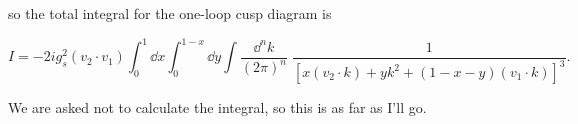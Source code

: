 so the total integral for the one-loop cusp diagram is

\begin{equation}
  I = -2ig_s^2 (v_2 \cdot v_1) \int_0^1 \dd x \int_0^{1-x} \dd y \int \frac{\dd^nk}{(2\pi)^n} \; \frac{1}{[x(v_2 \cdot k) + yk^2 + (1-x-y)(v_1 \cdot k)]^3}.
\end{equation}

We are asked not to calculate the integral, so this is as far as I'll go.




